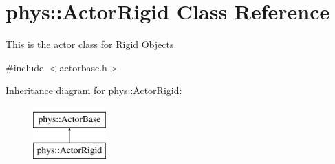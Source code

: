 \hypertarget{classphys_1_1ActorRigid}{
\section{phys::ActorRigid Class Reference}
\label{d8/d71/classphys_1_1ActorRigid}
}


This is the actor class for Rigid Objects.  




{\ttfamily \#include $<$actorbase.h$>$}

Inheritance diagram for phys::ActorRigid:\begin{figure}[H]
\begin{center}
\leavevmode
\includegraphics[height=2cm]{d8/d71/classphys_1_1ActorRigid}
\end{center}
\end{figure}

